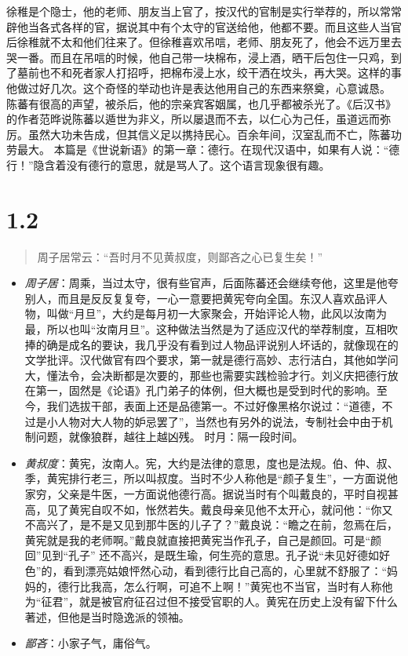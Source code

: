 \documentclass[]{book}
\providecommand{\tightlist}{%
  \setlength{\itemsep}{0pt}\setlength{\parskip}{0pt}}
\begin{document}
徐稚是个隐士，他的老师、朋友当上官了，按汉代的官制是实行举荐的，所以常常辟他当各式各样的官，据说其中有个太守的官送给他，他都不要。而且这些人当官后徐稚就不太和他们往来了。但徐稚喜欢吊唁，老师、朋友死了，他会不远万里去哭一番。而且在吊唁的时候，他自己带一块棉布，浸上酒，晒干后包住一只鸡，到了墓前也不和死者家人打招呼，把棉布浸上水，绞干洒在坟头，再大哭。这样的事他做过好几次。这个奇怪的举动也许是表达他用自己的东西来祭奠，心意诚恳。
陈蕃有很高的声望，被杀后，他的宗亲宾客姻属，也几乎都被杀光了。《后汉书》的作者范晔说陈蕃以遁世为非义，所以屡退而不去，以仁心为己任，虽道远而弥厉。虽然大功未告成，但其信义足以携持民心。百余年间，汉室乱而不亡，陈蕃功劳最大。
本篇是《世说新语》的第一章：德行。在现代汉语中，如果有人说：``德行！''隐含着没有德行的意思，就是骂人了。这个语言现象很有趣。

\section{1.2}\label{section-1}

\begin{quote}
周子居常云：``吾时月不见黄叔度，则鄙吝之心已复生矣！''
\end{quote}

\begin{itemize}
\tightlist
\item
  \emph{周子居}：周乘，当过太守，很有些官声，后面陈蕃还会继续夸他，这里是他夸别人，而且是反反复复夸，一心一意要把黄宪夸向全国。东汉人喜欢品评人物，叫做``月旦''，大约是每月初一大家聚会，开始评论人物，此风以汝南为最，所以也叫``汝南月旦''。这种做法当然是为了适应汉代的举荐制度，互相吹捧的确是成名的要诀，我几乎没有看到过人物品评说别人坏话的，就像现在的文学批评。汉代做官有四个要求，第一就是德行高妙、志行洁白，其他如学问大，懂法令，会决断都是次要的，那些也需要实践检验才行。刘义庆把德行放在第一，固然是《论语》孔门弟子的体例，但大概也是受到时代的影响。至今，我们选拔干部，表面上还是品德第一。不过好像黑格尔说过：``道德，不过是小人物对大人物的妒忌罢了''，当然也有另外的说法，专制社会中由于机制问题，就像狼群，越往上越凶残。
  时月：隔一段时间。
\item
  \emph{黄叔度}：黄宪，汝南人。宪，大约是法律的意思，度也是法规。伯、仲、叔、季，黄宪排行老三，所以叫叔度。当时不少人称他是``颜子复生''，一方面说他家穷，父亲是牛医，一方面说他德行高。据说当时有个叫戴良的，平时自视甚高，见了黄宪自叹不如，怅然若失。戴良母亲见他不太开心，就问他：``你又不高兴了，是不是又见到那牛医的儿子了？''戴良说：``瞻之在前，忽焉在后，黄宪就是我的老师啊。''戴良就直接把黄宪当作孔子，自己是颜回。可是``颜回''见到``孔子''
  还不高兴，是既生瑜，何生亮的意思。孔子说``未见好德如好色''的，看到漂亮姑娘怦然心动，看到德行比自己高的，心里就不舒服了：``妈妈的，德行比我高，怎么行啊，可追不上啊！''黄宪也不当官，当时有人称他为``征君''，就是被官府征召过但不接受官职的人。黄宪在历史上没有留下什么著述，但他是当时隐逸派的领袖。
\item
  \emph{鄙吝}：小家子气，庸俗气。
\end{itemize}
\end{document}
